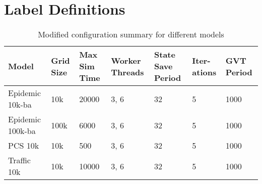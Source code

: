 \section{Label Definitions}
\begin{table}[h]
\centering
\footnotesize
\begin{tabularx}{\textwidth}{|l|X|X|X|X|X|X|}
\hline
\textbf{Model} & \textbf{Grid Size} & \textbf{Max Sim Time} & \textbf{Worker Threads} & \textbf{State Save Period} & \textbf{Iter-ations} & \textbf{GVT Period} \\
\hline
Epidemic 10k-ba & 10k & 20000 & 3, 6 & 32 & 5 & 1000 \\
\hline
Epidemic 100k-ba & 100k & 6000 & 3, 6 & 32 & 5 & 1000 \\
\hline
PCS 10k & 10k & 500 & 3, 6 & 32 & 5 & 1000 \\
\hline
Traffic 10k & 10k & 10000 & 3, 6 & 32 & 5 & 1000 \\
\hline
\end{tabularx}
\caption{Modified configuration summary for different models}
\label{table:modified_model_configs}
\end{table}
\newpage
\newpage

